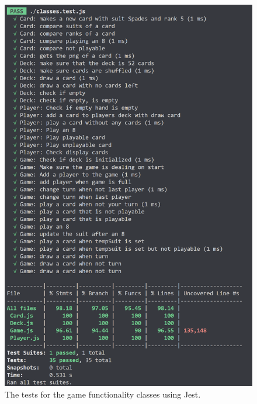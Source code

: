 \documentclass{article}
\begin{document}
\begin{figure}[h]
\centering
\includegraphics[width=\linewidth]{testss2_3.png}
\caption{\label{fig:testss2_3}The tests for the game functionality classes using Jest.}
\end{figure}
\end{document}
